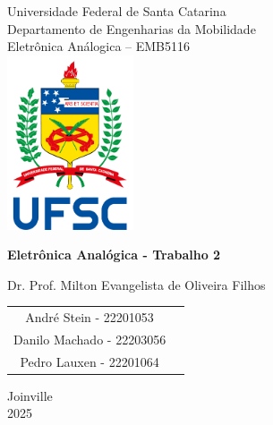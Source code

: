 \documentclass[12pt]{article}
\begin{document}
\begin{titlepage}
    \begin{center}
        Universidade Federal de Santa Catarina\\
        Departamento de Engenharias da Mobilidade \\ Eletrônica Análogica – EMB5116\\

        \vspace{1.5cm}
        \includegraphics[width=0.28\textwidth]{./images/vertical_sigla_fundo_claro.png}

        \vspace*{1.5cm}
        \fontsize{12pt}{16pt}\textbf{Eletrônica Analógica - Trabalho 2}

        \vspace*{1.5cm}
        Dr. Prof. Milton Evangelista de Oliveira Filhos

        \vspace*{1.0cm}
        \begin{tabular}{c c}
                André Stein - 22201053\\
                Danilo Machado - 22203056\\
                Pedro Lauxen - 22201064\\
        \end{tabular}

        \vspace*{\fill}
        {Joinville\\
        2025}
    \end{center}
\end{titlepage}


\tableofcontents\renewcommand*\contentsname{Sumário}
\newpage
\end{document}
